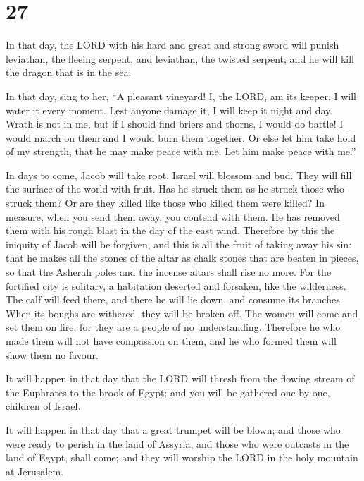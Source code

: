 \hypertarget{section-26}{%
\section{27}\label{section-26}}

 In that day, the LORD with his hard and great and strong
sword will punish leviathan, the fleeing serpent, and leviathan, the
twisted serpent; and he will kill the dragon that is in the sea.

 In that day, sing to her, ``A pleasant vineyard!
 I, the LORD, am its keeper. I will water it every moment.
Lest anyone damage it, I will keep it night and day.  Wrath
is not in me, but if I should find briers and thorns, I would do battle!
I would march on them and I would burn them together.  Or
else let him take hold of my strength, that he may make peace with me.
Let him make peace with me.''

 In days to come, Jacob will take root. Israel will blossom
and bud. They will fill the surface of the world with fruit.
 Has he struck them as he struck those who struck them? Or
are they killed like those who killed them were killed?  In
measure, when you send them away, you contend with them. He has removed
them with his rough blast in the day of the east wind. 
Therefore by this the iniquity of Jacob will be forgiven, and this is
all the fruit of taking away his sin: that he makes all the stones of
the altar as chalk stones that are beaten in pieces, so that the Asherah
poles and the incense altars shall rise no more.  For the
fortified city is solitary, a habitation deserted and forsaken, like the
wilderness. The calf will feed there, and there he will lie down, and
consume its branches.  When its boughs are withered, they
will be broken off. The women will come and set them on fire, for they
are a people of no understanding. Therefore he who made them will not
have compassion on them, and he who formed them will show them no
favour.

 It will happen in that day that the LORD will thresh from
the flowing stream of the Euphrates to the brook of Egypt; and you will
be gathered one by one, children of Israel.

 It will happen in that day that a great trumpet will be
blown; and those who were ready to perish in the land of Assyria, and
those who were outcasts in the land of Egypt, shall come; and they will
worship the LORD in the holy mountain at Jerusalem.

